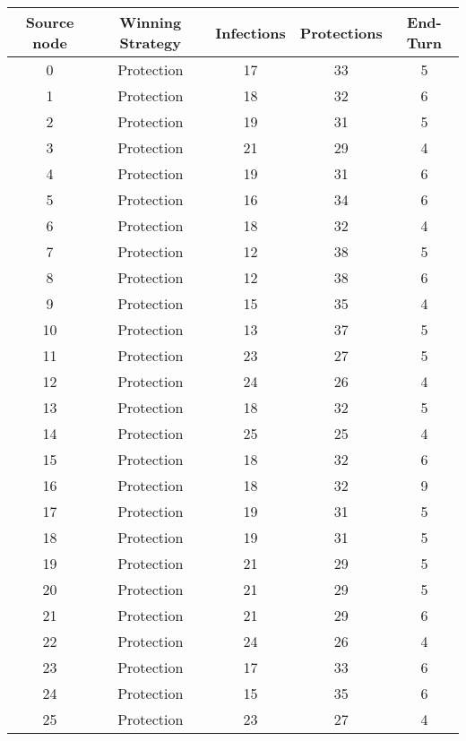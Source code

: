 \documentclass[results.tex]{subfiles}
\begin{document}
\begin{center}
  \begin{tabular}{| c || c | c | c | c |}
    \hline
    {\bfseries Source node} & {\bfseries Winning Strategy} & {\bfseries Infections} & {\bfseries Protections} & {\bfseries End-Turn} \\  %
    \hline\hline
    0 & Protection & 17 & 33 & 5 \\ 
    \hline
    1 & Protection & 18 & 32 & 6 \\ 
    \hline
    2 & Protection & 19 & 31 & 5 \\ 
    \hline
    3 & Protection & 21 & 29 & 4 \\ 
    \hline
    4 & Protection & 19 & 31 & 6 \\ 
    \hline
    5 & Protection & 16 & 34 & 6 \\ 
    \hline
    6 & Protection & 18 & 32 & 4 \\ 
    \hline
    7 & Protection & 12 & 38 & 5 \\ 
    \hline
    8 & Protection & 12 & 38 & 6 \\ 
    \hline
    9 & Protection & 15 & 35 & 4 \\ 
    \hline
    10 & Protection & 13 & 37 & 5 \\ 
    \hline
    11 & Protection & 23 & 27 & 5 \\ 
    \hline
    12 & Protection & 24 & 26 & 4 \\ 
    \hline
    13 & Protection & 18 & 32 & 5 \\ 
    \hline
    14 & Protection & 25 & 25 & 4 \\ 
    \hline
    15 & Protection & 18 & 32 & 6 \\ 
    \hline
    16 & Protection & 18 & 32 & 9 \\ 
    \hline
    17 & Protection & 19 & 31 & 5 \\ 
    \hline
    18 & Protection & 19 & 31 & 5 \\ 
    \hline
    19 & Protection & 21 & 29 & 5 \\ 
    \hline
    20 & Protection & 21 & 29 & 5 \\ 
    \hline
    21 & Protection & 21 & 29 & 6 \\ 
    \hline
    22 & Protection & 24 & 26 & 4 \\ 
    \hline
    23 & Protection & 17 & 33 & 6 \\ 
    \hline
    24 & Protection & 15 & 35 & 6 \\ 
    \hline
    25 & Protection & 23 & 27 & 4 \\ 

\end{tabular}
\end{center}
\end{document}
